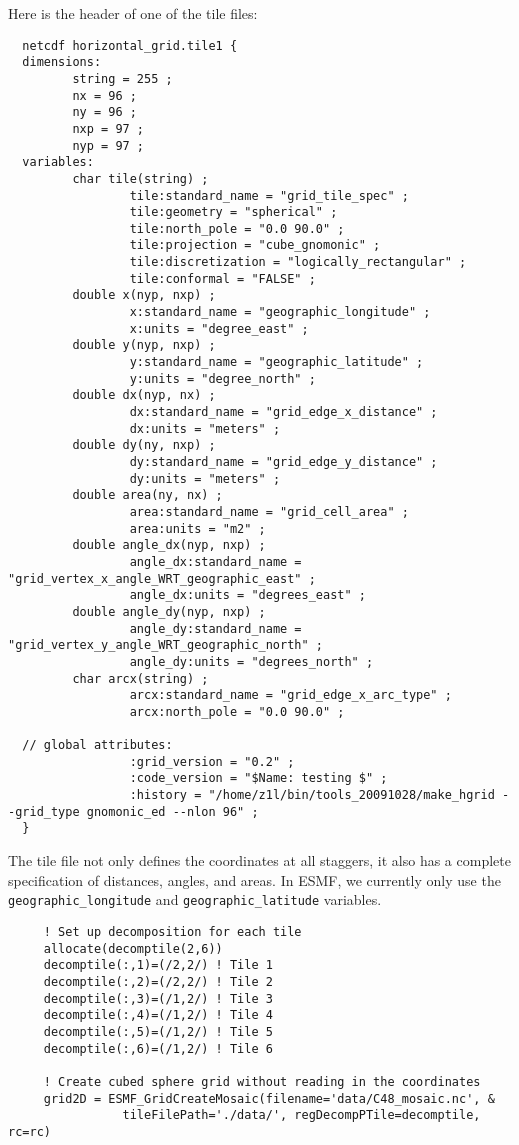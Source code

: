   Here is the header of one of the tile files:
  
  \begin{verbatim}
  netcdf horizontal_grid.tile1 {
  dimensions:
         string = 255 ;
         nx = 96 ;
         ny = 96 ;
         nxp = 97 ;
         nyp = 97 ;
  variables:
         char tile(string) ;
                 tile:standard_name = "grid_tile_spec" ;
                 tile:geometry = "spherical" ;
                 tile:north_pole = "0.0 90.0" ;
                 tile:projection = "cube_gnomonic" ;
                 tile:discretization = "logically_rectangular" ;
                 tile:conformal = "FALSE" ;
         double x(nyp, nxp) ;
                 x:standard_name = "geographic_longitude" ;
                 x:units = "degree_east" ;
         double y(nyp, nxp) ;
                 y:standard_name = "geographic_latitude" ;
                 y:units = "degree_north" ;
         double dx(nyp, nx) ;
                 dx:standard_name = "grid_edge_x_distance" ;
                 dx:units = "meters" ;
         double dy(ny, nxp) ;
                 dy:standard_name = "grid_edge_y_distance" ;
                 dy:units = "meters" ;
         double area(ny, nx) ;
                 area:standard_name = "grid_cell_area" ;
                 area:units = "m2" ;
         double angle_dx(nyp, nxp) ;
                 angle_dx:standard_name = "grid_vertex_x_angle_WRT_geographic_east" ;
                 angle_dx:units = "degrees_east" ;
         double angle_dy(nyp, nxp) ;
                 angle_dy:standard_name = "grid_vertex_y_angle_WRT_geographic_north" ;
                 angle_dy:units = "degrees_north" ;
         char arcx(string) ;
                 arcx:standard_name = "grid_edge_x_arc_type" ;
                 arcx:north_pole = "0.0 90.0" ;
  
  // global attributes:
                 :grid_version = "0.2" ;
                 :code_version = "$Name: testing $" ;
                 :history = "/home/z1l/bin/tools_20091028/make_hgrid --grid_type gnomonic_ed --nlon 96" ;
  }
  \end{verbatim}
  
  The tile file not only defines the coordinates at all staggers, it also has a complete specification of
  distances, angles, and areas.  In ESMF, we currently only use the {\tt geographic\_longitude} and {\tt geographic\_latitude}
  variables. 

 \begin{verbatim}
     ! Set up decomposition for each tile
     allocate(decomptile(2,6))
     decomptile(:,1)=(/2,2/) ! Tile 1
     decomptile(:,2)=(/2,2/) ! Tile 2
     decomptile(:,3)=(/1,2/) ! Tile 3
     decomptile(:,4)=(/1,2/) ! Tile 4
     decomptile(:,5)=(/1,2/) ! Tile 5
     decomptile(:,6)=(/1,2/) ! Tile 6

     ! Create cubed sphere grid without reading in the coordinates
     grid2D = ESMF_GridCreateMosaic(filename='data/C48_mosaic.nc', &
                tileFilePath='./data/', regDecompPTile=decomptile, rc=rc)

 
\end{verbatim}
 
